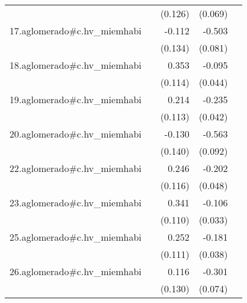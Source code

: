 {\begin{longtable}{l*{4}{D{.}{.}{-1}}}
            &                     &     (0.126)         &     (0.069)         &                     \\
\addlinespace
17.aglomerado#c.hv\_miemhabi&                     &      -0.112         &      -0.503\sym{***}&                     \\
            &                     &     (0.134)         &     (0.081)         &                     \\
\addlinespace
18.aglomerado#c.hv\_miemhabi&                     &       0.353\sym{**} &      -0.095\sym{*}  &                     \\
            &                     &     (0.114)         &     (0.044)         &                     \\
\addlinespace
19.aglomerado#c.hv\_miemhabi&                     &       0.214         &      -0.235\sym{***}&                     \\
            &                     &     (0.113)         &     (0.042)         &                     \\
\addlinespace
20.aglomerado#c.hv\_miemhabi&                     &      -0.130         &      -0.563\sym{***}&                     \\
            &                     &     (0.140)         &     (0.092)         &                     \\
\addlinespace
22.aglomerado#c.hv\_miemhabi&                     &       0.246\sym{*}  &      -0.202\sym{***}&                     \\
            &                     &     (0.116)         &     (0.048)         &                     \\
\addlinespace
23.aglomerado#c.hv\_miemhabi&                     &       0.341\sym{**} &      -0.106\sym{**} &                     \\
            &                     &     (0.110)         &     (0.033)         &                     \\
\addlinespace
25.aglomerado#c.hv\_miemhabi&                     &       0.252\sym{*}  &      -0.181\sym{***}&                     \\
            &                     &     (0.111)         &     (0.038)         &                     \\
\addlinespace
26.aglomerado#c.hv\_miemhabi&                     &       0.116         &      -0.301\sym{***}&                     \\
            &                     &     (0.130)         &     (0.074)         &                     \\

\end{longtable}}
